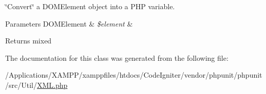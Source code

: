 \char`\"{}\+Convert\char`\"{} a D\+O\+M\+Element object into a P\+HP variable.


\begin{DoxyParams}[1]{Parameters}
D\+O\+M\+Element & {\em \$element} & \\
\hline
\end{DoxyParams}
\begin{DoxyReturn}{Returns}
mixed 
\end{DoxyReturn}


The documentation for this class was generated from the following file\+:\begin{DoxyCompactItemize}
\item 
/\+Applications/\+X\+A\+M\+P\+P/xamppfiles/htdocs/\+Code\+Igniter/vendor/phpunit/phpunit/src/\+Util/\mbox{\hyperlink{_x_m_l_8php}{X\+M\+L.\+php}}\end{DoxyCompactItemize}
